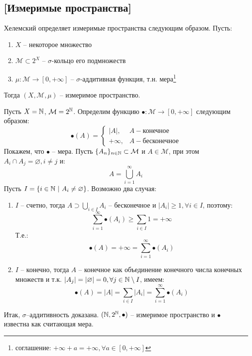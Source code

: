 \documentclass[../main.tex]{subfiles}
\begin{document}
\subsection{[Измеримые пространства]}

Хелемский определяет измеримые пространства следующим образом. Пусть:
\begin{enumerate}
	\item $X$ -- некоторое множество
	\item $\mathcal{M} \subset 2^X$ -- $\sigma$-кольцо его подмножеств
	\item $\mu : \mathcal{M} \to [0, +\infty]$ -- $\sigma$-аддитивная функция, т.н. мера\footnote{соглашение: $+\infty + a = +\infty, \forall a \in [0, +\infty]$}
\end{enumerate}
Тогда $(X, \mathcal{M}, \mu)$ -- измеримое пространство. 

\begin{example}
	Пусть $X = \mathbb{N}$, $\mathcal{M} = 2^{\mathbb{N}}$. Определим функцию $\bullet : \mathcal{M} \to [0, +\infty]$ следующим образом:
	\begin{equation}
		\bullet (A) = \begin{cases}|A|, &A - \text{конечное} \\ +\infty, &A - \text{бесконечное}\end{cases}
	\end{equation}
	Покажем, что $\bullet$ -- мера. Пусть $\{A_n\}_{n \in \mathbb{N}} \subset \mathcal{M}$ и $A \in \mathcal{M}$, при этом \\ $A_i \cap A_j = \varnothing, i \neq j$ и:
	$$A = \bigcup_{i=1}^{\infty}{A_i}$$
	Пусть $I = \{i \in \mathbb{N} \ | \ A_i \neq \varnothing \}$. Возможно два случая:
	
	\begin{enumerate}
		\item $I$ -- счетно, тогда $A \supset \bigcup\limits_{i \in I}{A_i}$ -- бесконечное и $|A_i| \geq 1, \forall i \in I$, поэтому:
		$$\sum_{i=1}^{\infty}{\bullet(A_i)} \geq \sum_{i \in I}{1} = +\infty$$
		Т.е.:
		$$\bullet(A) = +\infty = \sum_{i=1}^{\infty}{\bullet(A_i)}$$
		\item $I$ -- конечно, тогда $A$ -- конечное как объединение конечного числа конечных множеств и т.к. $|A_j| = |\varnothing| = 0, \forall j \in \mathbb{N} \setminus I$, имеем:
		$$\bullet(A) = |A| = \sum\limits_{i \in I}{|A_i|} = \sum\limits_{i=1}^{\infty}{\bullet(A_i)}$$
	\end{enumerate}
	
	Итак, $\sigma$--аддитивность доказана. $(\mathbb{N}, 2^{\mathbb{N}}, \bullet)$ -- измеримое пространство и $\bullet$ известна как считающая мера.
\end{example}
\end{document}
